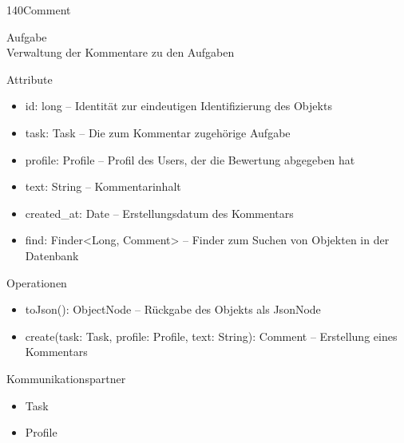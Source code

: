 \newpage
\begin{class}{140}{Comment}
\item[Aufgabe]~\\
Verwaltung der Kommentare zu den Aufgaben
\item[Attribute]~\\
\begin{itemize}
\item id: long -- Identität zur eindeutigen Identifizierung des Objekts
\item task: Task -- Die zum Kommentar zugehörige Aufgabe
\item profile: Profile -- Profil des Users, der die Bewertung abgegeben hat
\item text: String -- Kommentarinhalt
\item created\_at: Date -- Erstellungsdatum des Kommentars
\item find: Finder<Long, Comment> -- Finder zum Suchen von Objekten in der Datenbank
\end{itemize}
\item[Operationen]~\\
\begin{itemize}
\item toJson(): ObjectNode -- Rückgabe des Objekts als JsonNode
\item create(task: Task, profile: Profile, text: String):
   Comment -- Erstellung eines Kommentars
\end{itemize}
\item[Kommunikationspartner]~\\
\begin{itemize}
\item Task
\item Profile
\end{itemize}
\end{class}

